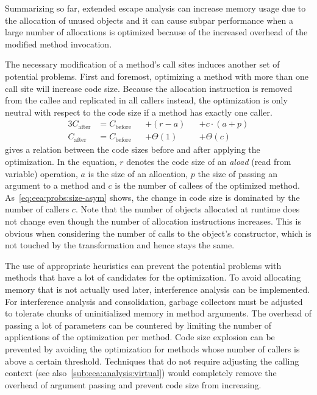 		Summarizing so far, extended escape analysis can increase memory usage due to the allocation of unused objects and
		it can cause subpar performance when a large number of allocations is optimized because of the increased overhead of
		the modified method invocation.

		The necessary modification of a method's call sites induces another set of potential problems. First and foremost,
		optimizing a method with more than one call site will increase code size. Because the allocation instruction is
		removed from the callee and replicated in all callers instead, the optimization is only neutral with respect to the
		code size if a method has exactly one caller.
		\begin{alignat}{3}
			C_\text{after}
				&= C_\text{before} &&+ (r - a)   &&+ c \cdot (a + p) \label{eq:eea:probs:size}\\
			C_\text{after}
				&= C_\text{before} &&+ \Theta(1) &&+ \Theta(c) \label{eq:eea:probs:size-asym}
		\end{alignat}
		 gives a relation between the code sizes before and after applying the optimization. In the
		equation, $r$ denotes the code size of an \emph{aload} (read from variable) operation, $a$ is the size of an
		allocation, $p$ the size of passing an argument to a method and $c$ is the number of callees of the optimized
		method. As~\cref{eq:eea:probs:size-asym} shows, the change in code size is dominated by the number of callers $c$.
		Note that the number of objects allocated at runtime does not change even though the number of allocation
		instructions increases. This is obvious when considering the number of calls to the object's constructor, which is
		not touched by the transformation and hence stays the same.

		The use of appropriate heuristics can prevent the potential problems with methods that have a lot of candidates for
		the optimization. To avoid allocating memory that is not actually used later, interference analysis can be
		implemented. For interference analysis and consolidation, garbage collectors must be adjusted to tolerate chunks of
		uninitialized memory in method arguments. The overhead of passing a lot of parameters can be countered by limiting
		the number of applications of the optimization per method. Code size explosion can be prevented by avoiding the
		optimization for methods whose number of callers is above a certain threshold. Techniques that do not require
		adjusting the calling context (see also~\cref{sub:eea:analysis:virtual}) would completely remove the overhead of
		argument passing and prevent code size from increasing.

